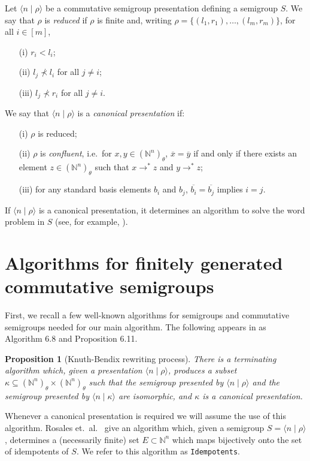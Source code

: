 \documentclass[12pt]{article}
\def\N{{\mathbb{N}}}
\newtheorem{proposition}{\bf Proposition}
\begin{document}
Let $\langle n\mid\rho\rangle$ be a 
commutative semigroup presentation defining a semigroup $S$.
We say that $\rho$ is \emph{reduced} if $\rho$ is finite and, writing
$\rho=\{(l_1,r_1),\ldots,(l_m,r_m)\}$, 
for all $i\in [m]$,
\begin{itemize}
\item[(i)]
$r_i<l_i$;
\item[(ii)]
$l_j\nprec l_i$ for all $j\neq i$;
\item[(iii)]
$l_j\nprec r_i$ for all $j\neq i$.
\end{itemize} 
We say that $\langle n\mid\rho\rangle$ is a \emph{canonical presentation} 
if:
\begin{itemize}
\item[(i)]
$\rho$ is reduced;
\item[(ii)]
$\rho$ is {\em confluent}, i.e.~for $x,y\in(\mathbb{N}^n)_{\theta}$, 
$\overline{x}=\overline{y}$ if and
only if there exists an element $z\in(\mathbb{N}^n)_{\theta}$ such
that $x\rightarrow^*z$ and $y\rightarrow^*z$;
\item[(iii)]
for any standard basis elements $b_i$ and $b_j$, 
$\overline{b_i} = \overline{b_j}$ implies $i=j$.
\end{itemize}
If  $\langle n\mid\rho\rangle$ is a canonical presentation,
it determines an algorithm to solve the word
problem in $S$ (see, for example, \cite{bRG99}).

\section{Algorithms for finitely generated commutative semigroups}

First, we recall a few well-known algorithms for semigroups 
and commutative semigroups needed for our main algorithm. 
The following appears in \cite{bRG99}
as Algorithm 6.8 and Proposition 6.11.

\begin{proposition}[Knuth-Bendix rewriting process]
There is a terminating algorithm which, given a presentation  
$\langle n  \mid \rho \rangle$,
produces a  subset $\kappa \subseteq 
(\N^n)_\theta \times (\N^n)_\theta$ such that 
the semigroup presented by $\langle n  \mid \rho \rangle$ and
the semigroup presented by $\langle n  \mid \kappa \rangle$ 
are isomorphic,
and $\kappa$ is a canonical presentation.
\end{proposition}

Whenever a canonical presentation is required we will assume the use
of this algorithm. Rosales et.~al.~\cite{pRGG99} give an 
algorithm  which, given a semigroup $S = \langle n \mid \rho \rangle$, 
determines a (necessarily finite) set $E \subset \mathbb{N}^n$ which 
maps bijectively onto the set of idempotents of $S$. 
We refer to this algorithm as {\tt Idempotents}.
\end{document}
